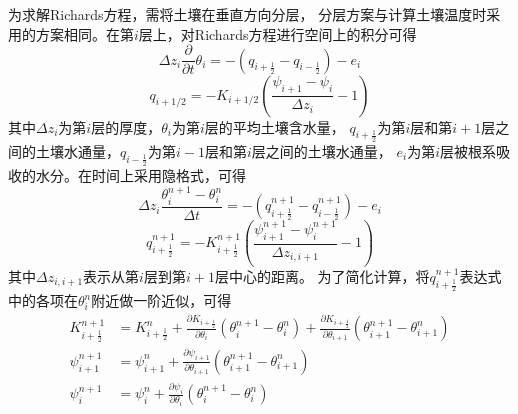 为求解Richards方程，需将土壤在垂直方向分层，
分层方案与计算土壤温度时采用的方案相同。在第$i$层上，对Richards方程进行空间上的积分可得
\begin{equation}
\Delta z_{i} \frac{\partial}{\partial t} \theta_{i}=-\left(q_{i+\frac{1}{2}}-q_{i-\frac{1}{2}}\right)-e_{i}
\end{equation}
\begin{equation}
q_{i+1 / 2}=-K_{i+1 / 2}\left(\frac{\psi_{i+1}-\psi_{i}}{\Delta z_{i}}-1\right)
\end{equation}
其中$\Delta {z_i}$为第$i$层的厚度，$\theta_i$为第$i$层的平均土壤含水量，
$q_{i+\frac{1}{2}}$为第$i$层和第$i+1$层之间的土壤水通量，$q_{i-\frac{1}{2}}$为第$i-1$层和第$i$层之间的土壤水通量，
$e_i$为第$i$层被根系吸收的水分。在时间上采用隐格式，可得
\begin{equation}
\Delta z_{i} \frac{\theta_{i}^{n+1}-\theta_{i}^{n}}{\Delta t}=-\left(q_{i+\frac{1}{2}}^{n+1}-q_{i-\frac{1}{2}}^{n+1}\right)-e_{i}
\end{equation}
\begin{equation}
q_{i+\frac{1}{2}}^{n+1}=-K_{i+\frac{1}{2}}^{n+1}\left(\frac{\psi_{i+1}^{n+1}-\psi_{i}^{n+1}}{\Delta z_{i, i+1}}-1\right)
\end{equation}
其中$\Delta z_{i,i+1}$表示从第$i$层到第$i+1$层中心的距离。
为了简化计算，将$q_{i+\frac{1}{2}}^{n+1}$表达式中的各项在$\theta_i^n$附近做一阶近似，可得
\begin{equation}
\begin{aligned}
K_{i+\frac{1}{2}}^{n+1} &= K_{i+\frac{1}{2}}^{n}+\frac{\partial K_{i+\frac{1}{2}}}
    {\partial \theta_{i}}\left(\theta_{i}^{n+1}-\theta_{i}^{n}\right)+\frac{\partial K_{i+\frac{1}{2}}}
    {\partial \theta_{i+1}}\left(\theta_{i+1}^{n+1}-\theta_{i+1}^{n}\right) \\ 
\psi_{i+1}^{n+1} &= \psi_{i+1}^{n}+\frac{\partial \psi_{i+1}}{\partial \theta_{i+1}}\left(\theta_{i+1}^{n+1}-\theta_{i+1}^{n}\right) \\
\psi_{i}^{n+1} &= \psi_{i}^{n}+\frac{\partial \psi_{i}}{\partial \theta_{i}}\left(\theta_{i}^{n+1}-\theta_{i}^{n}\right)
\end{aligned}
\end{equation}

